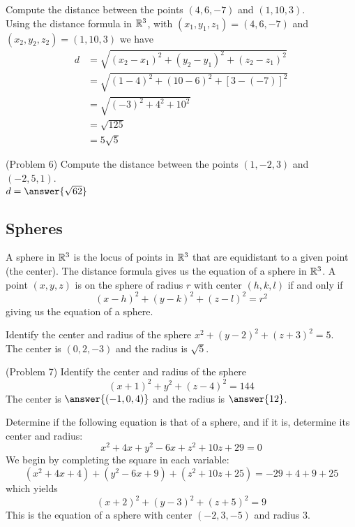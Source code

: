 \documentclass[handout]{ximera}
\begin{document}

\begin{example}[Example 6]
Compute the distance between the points $(4, 6, -7)$ and $(1,10, 3)$.\\
Using the distance formula in $\mathbb R^3$, with $(x_1, y_1, z_1) = (4,6,-7)$ and $(x_2, y_2, z_2) = (1,10,3)$ we have
\begin{align*}
d &= \sqrt{(x_2 -x_1)^2+(y_2 -y_1)^2+(z_2 -z_1)^2}\\
  &= \sqrt{(1-4)^2+(10-6 )^2+[3-(-7)]^2}\\
  &= \sqrt{(-3)^2 + 4^2 +10^2}\\
  &= \sqrt{125}\\
  &= 5\sqrt 5
\end{align*}

\end{example}
\begin{problem}(Problem 6) 
Compute the distance between the points $(1, -2, 3)$ and $(-2, 5, 1)$.\\
$d = \answer{\sqrt{62}}$
\end{problem}

\subsection{Spheres}
A sphere in $\mathbb R^3$ is the locus of points in $\mathbb R^3$ that are equidistant to a given point (the center).
The distance formula gives us the equation of a sphere in $\mathbb R^3$.  A point $(x, y, z)$ is on the sphere of radius $r$ with center $(h, k, l)$
if and only if
\[
(x-h)^2 + (y-k)^2 + (z -l)^2 = r^2
\]
giving us the equation of a sphere.

\begin{example}[Example 7]
Identify the center and radius of the sphere $x^2 + (y-2)^2 + (z+3)^2 = 5$.\\
The center is $(0, 2, -3)$ and the radius is $\sqrt 5$.
\end{example}

\begin{problem}(Problem 7)
Identify the center and radius of the sphere 
\[
(x+1)^2 + y^2 + (z-4)^2 = 144
\]
The center is $\answer{(-1, 0, 4)}$ and the radius is $\answer{12}$.
\end{problem}


\begin{example}[Example 8]
Determine if the following equation is that of a sphere, and if it is, determine its center and radius:
\[
x^2 + 4x + y^2 - 6x + z^2 + 10z + 29 = 0
\]
We begin by completing the square in each variable:
\[
(x^2 + 4x + 4) + (y^2 - 6x + 9) + (z^2 + 10z + 25) =-29 + 4 + 9 + 25
\]
which yields
\[
(x+2)^2 +(y-3)^2 + (z+5)^2 = 9
\]
This is the equation of a sphere with center $(-2, 3, -5)$ and radius $3$. 
\end{example}
\end{document}
